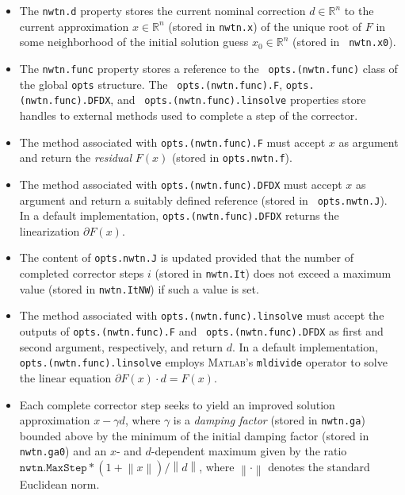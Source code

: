 \documentclass{article}
\begin{document}
\begin{itemize}
\item The \texttt{nwtn.d} property stores the current nominal correction $%
d\in \mathbb{R}^{n}$ to the current approximation $x\in \mathbb{R}^{n}$
(stored in \texttt{nwtn.x}) of the unique root of $F$ in some neighborhood
of the initial solution guess $x_{0}\in \mathbb{R}^{n}$ (stored in \texttt{%
nwtn.x0}).

\item The \texttt{nwtn.func} property stores a reference to the \texttt{%
opts.(nwtn.func)} class of the global \texttt{opts} structure. The \texttt{%
opts.(nwtn.func).F}, \texttt{opts.(nwtn.func).DFDX}, and \texttt{%
opts.(nwtn.func).linsolve} properties store handles to external methods used
to complete a step of the corrector.

\item The method associated with \texttt{opts.(nwtn.func).F} must accept $x$
as argument and return the \emph{residual} $F\left( x\right) $ (stored in 
\texttt{opts.nwtn.f}).

\item The method associated with \texttt{opts.(nwtn.func).DFDX} must accept $%
x$ as argument and return a suitably defined reference (stored in \texttt{%
opts.nwtn.J}). In a default implementation, \texttt{opts.(nwtn.func).DFDX}
returns the linearization $\partial F\left( x\right) $.

\item The content of \texttt{opts.nwtn.J} is updated provided that the
number of completed corrector steps $i$ (stored in \texttt{nwtn.It}) does
not exceed a maximum value (stored in \texttt{nwtn.ItNW}) if such a value is
set.

\item The method associated with \texttt{opts.(nwtn.func).linsolve} must
accept the outputs of \texttt{opts.(nwtn.func).F} and \texttt{%
opts.(nwtn.func).DFDX} as first and second argument, respectively, and
return $d$. In a default implementation, \texttt{opts.(nwtn.func).linsolve}
employs \textsc{Matlab}'s \texttt{mldivide} operator to solve the linear
equation $\partial F\left( x\right) \cdot d=F\left( x\right) $.

\item Each complete corrector step seeks to yield an improved solution
approximation $x-\gamma d$, where $\gamma $ is a \emph{damping factor}
(stored in \texttt{nwtn.ga}) bounded above by the minimum of the initial
damping factor (stored in \texttt{nwtn.ga0}) and an $x$- and $d$-dependent
maximum given by the ratio $\mathtt{nwtn.MaxStep}\ast \left( 1+\left\|
x\right\| \right) /\left\| d\right\| $, where $\left\| \cdot \right\| $
denotes the standard Euclidean norm.


\end{itemize}
\end{document}
